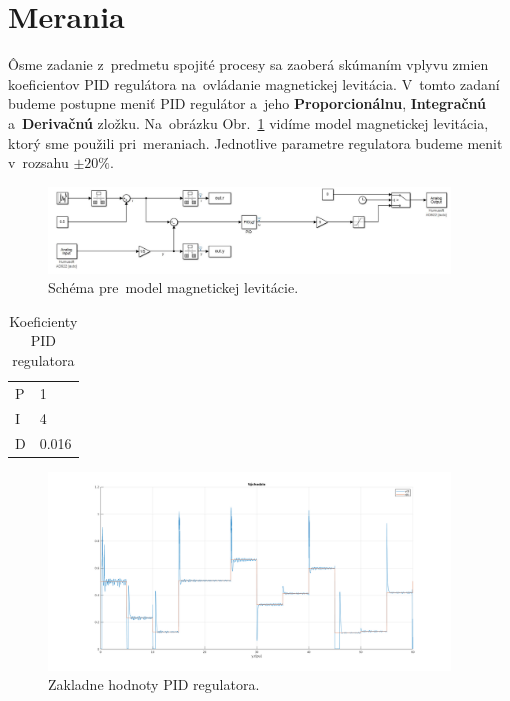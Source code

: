 \documentclass{article}
\begin{document}
\clearpage

\section{Merania}
\label{sec:merania}

Ôsme zadanie z~predmetu spojité procesy sa zaoberá skúmaním vplyvu zmien koeficientov PID regulátora
na~ovládanie magnetickej levitácia. V~tomto zadaní budeme postupne meniť PID regulátor a~jeho \textbf{Proporcionálnu},
\textbf{Integračnú} a~\textbf{Derivačnú} zložku. Na~obrázku Obr.~\ref{fig:schema} vidíme model magnetickej levitácia,
ktorý sme použili pri~meraniach. Jednotlive parametre regulatora budeme menit v~rozsahu $\pm20\%$.

\begin{figure}[!htbp]
	\begin{center}
		\includegraphics[width=0.95\textwidth]{include/schema.png}
	\end{center}
	\caption{Schéma pre~model magnetickej levitácie.}
	\label{fig:schema}
\end{figure}

\begin{table}[!htbp]
	\caption{Koeficienty PID regulatora}
	\label{tab:t0}
	\begin{center}
		\begin{tabular}[c]{|l|l|}
			\hline

			P & 1 \\
			I & 4 \\
			D & 0.016 \\
			\hline
		\end{tabular}
	\end{center}
\end{table}

\begin{figure}[!htbp]
	\begin{center}
		\includegraphics[width=0.95\textwidth]{include/m1.png}
	\end{center}
	\caption{Zakladne hodnoty PID regulatora.}
	\label{fig:m1}
\end{figure}
\end{document}
